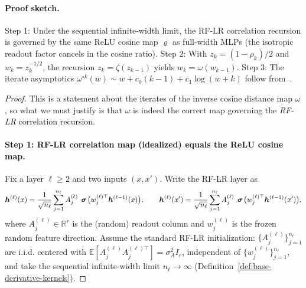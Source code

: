 \paragraph{Proof sketch.} Step 1: Under the sequential infinite-width limit, the RF-LR correlation recursion is governed by the same ReLU cosine map \(\varrho\) as full-width MLPs (the isotropic readout factor cancels in the cosine ratio). Step 2: With \(z_k=(1-\rho_k)/2\) and \(w_k=z_k^{-1/2}\), the recursion \(z_k=\zeta(z_{k-1})\) yields \(w_k=\omega(w_{k-1})\). Step 3: The iterate asymptotics \(\omega^{\circ k}(w)\sim w+c_0(k-1)+c_1\log(w+k)\) follow from~\cite{terjek2025mlpsateoc}.
\begin{proof}
This is a statement about the iterates of the inverse cosine distance map \(\omega\), so what we must justify is that \(\omega\) is indeed the correct map governing the \emph{RF-LR} correlation recursion.

\paragraph{Step 1: RF-LR correlation map (idealized) equals the ReLU cosine map.}
Fix a layer \(\ell\ge 2\) and two inputs \((x,x')\). Write the RF-LR layer as
\[
\bm{h}^{(\ell)}(x) = \frac{1}{\sqrt{n_\ell}}\sum_{j=1}^{n_\ell} A^{(\ell)}_{j}\,\mathrel{\boldsymbol{\sigma}}\!\big(w^{(\ell)\top}_j\bm{h}^{(\ell-1)}(x)\big),
\qquad
\bm{h}^{(\ell)}(x') = \frac{1}{\sqrt{n_\ell}}\sum_{j=1}^{n_\ell} A^{(\ell)}_{j}\,\mathrel{\boldsymbol{\sigma}}\!\big(w^{(\ell)\top}_j\bm{h}^{(\ell-1)}(x')\big),
\]
where \(A^{(\ell)}_{j}\in\mathbb{R}^{r}\) is the (random) readout column and \(w^{(\ell)}_j\) is the frozen random feature direction. Assume the standard RF-LR initialization: \(\{A^{(\ell)}_{j}\}_{j=1}^{n_\ell}\) are i.i.d. centered with \(\mathbb{E}[A^{(\ell)}_{j}A^{(\ell)\top}_{j}]=\sigma_A^2 I_r\), independent of \(\{w^{(\ell)}_j\}_{j=1}^{n_\ell}\), and take the sequential infinite-width limit \(n_\ell\to\infty\) (Definition~\ref{def:base-derivative-kernels}).


\end{proof}
